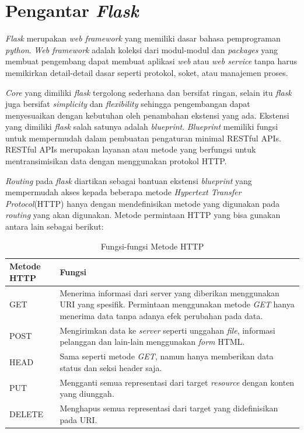 \section{Pengantar \emph{Flask}}
\emph{Flask} merupakan \emph{web framework} yang memiliki dasar bahasa pemprograman \emph{python}. \emph{Web framework} adalah koleksi dari modul-modul dan \emph{packages} yang membuat pengembang dapat membuat aplikasi \emph{web} atau \emph{web service} tanpa harus memikirkan detail-detail dasar seperti protokol, soket, atau manajemen proses.

\emph{Core} yang dimiliki \emph{flask} tergolong sederhana dan bersifat ringan, selain itu \emph{flask} juga bersifat \emph{simplicity} dan \emph{flexibility} sehingga pengembangan dapat menyesuaikan dengan kebutuhan oleh penambahan ekstensi yang ada. Ekstensi yang dimiliki \emph{flask} salah satunya adalah \emph{blueprint}. \emph{Blueprint} memiliki fungsi untuk mempermudah dalam pembuatan pengaturan minimal RESTful APIs. RESTful APIs merupakan layanan atau metode yang berfungsi untuk mentransimisikan data dengan menggunakan protokol HTTP.

\emph{Routing} pada \emph{flask} diartikan sebagai bantuan ekstensi \emph{blueprint} yang mempermudah akses kepada beberapa metode \emph{Hypertext Transfer Protocol}(HTTP) hanya dengan mendefinisikan metode yang digunakan pada \emph{routing} yang akan digunakan. Metode permintaan HTTP yang bisa gunakan antara lain sebagai berikut:

\begin{table}[H]
	\centering
	\caption{Fungsi-fungsi Metode HTTP}
	\label{tabel_input}
	\begin{tabular}{|m{3cm}|m{9cm}|}
		\hline
		\textbf{Metode HTTP} & \textbf{Fungsi}\\
		\hline
		
		GET &
		\setstretch{1}
		Menerima informasi dari server yang diberikan menggunakan 
		URI yang spesifik. Permintaan menggunakan metode \emph{GET} hanya menerima data tanpa adanya efek perubahan pada data.\\
		\hline
		
		POST &
		\setstretch{1}
		Mengirimkan data ke \emph{server} seperti unggahan \emph{file}, informasi pelanggan dan lain-lain menggunakan \emph{form} HTML.\\
		\hline
		
		HEAD &
		\setstretch{1}
		Sama seperti metode \emph{GET}, namun hanya memberikan data status dan seksi header saja.\\
		\hline
		
		PUT &
		\setstretch{1}
		Mengganti semua representasi dari target \emph{resource} dengan konten yang diunggah.\\
		\hline
		
		DELETE &
		\setstretch{1}
		Menghapus semua representasi dari target yang didefinisikan pada URI.\\
		\hline
		
	\end{tabular}
\end{table}

